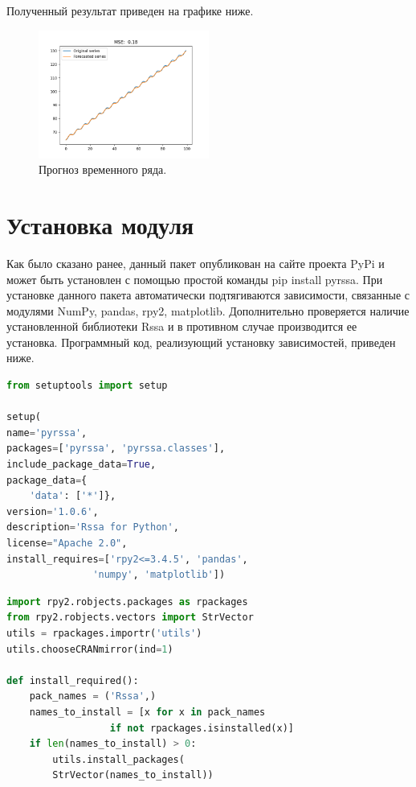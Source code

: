 \documentclass[specialist,
			   substylefile = spbu_report.rtx,
			   subf,href,colorlinks=true, 12pt]{disser}
\begin{document}
Полученный результат приведен на графике ниже.

\begin{figure}[H]
	\centering
	\includegraphics[width=0.5\textwidth]{mpy_for}
	\caption{Прогноз временного ряда.}
	\label{fig:mpy_for}
\end{figure}

\section{Установка модуля}

Как было сказано ранее, данный пакет опубликован на сайте проекта PyPi \cite{pyrssa-lib} и может быть установлен с помощью простой команды pip install pyrssa. При установке данного пакета автоматически подтягиваются зависимости, связанные с модулями NumPy, pandas, rpy2, matplotlib. Дополнительно проверяется наличие установленной библиотеки Rssa и в противном случае производится ее установка. Программный код, реализующий установку зависимостей, приведен ниже.

\begin{lstlisting}[language=Python, caption=Настройки проекта для публикации пакета на сайте PyPi.]
from setuptools import setup

setup(
name='pyrssa',
packages=['pyrssa', 'pyrssa.classes'],
include_package_data=True,
package_data={
	'data': ['*']},
version='1.0.6',
description='Rssa for Python',
license="Apache 2.0",
install_requires=['rpy2<=3.4.5', 'pandas', 
               'numpy', 'matplotlib'])
\end{lstlisting}

\begin{lstlisting}[language=Python, caption=Содержимое файла для инсталляции модуля Rssa.]
import rpy2.robjects.packages as rpackages
from rpy2.robjects.vectors import StrVector
utils = rpackages.importr('utils')
utils.chooseCRANmirror(ind=1)

def install_required():
	pack_names = ('Rssa',)
	names_to_install = [x for x in pack_names 
                  if not rpackages.isinstalled(x)]
	if len(names_to_install) > 0:
		utils.install_packages(
		StrVector(names_to_install))
\end{lstlisting}
\end{document}
